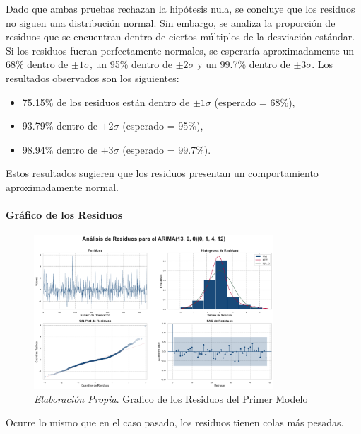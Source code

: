 \documentclass[12pt,letterpaper]{article}   %
\begin{document}
Dado que ambas pruebas rechazan la hipótesis nula, se concluye que los residuos no siguen una distribución normal. Sin embargo, se analiza la proporción de residuos que se encuentran dentro de ciertos múltiplos de la desviación estándar. Si los residuos fueran perfectamente normales, se esperaría aproximadamente un 68\% dentro de $\pm1\sigma$, un 95\% dentro de $\pm2\sigma$ y un 99.7\% dentro de $\pm3\sigma$. Los resultados observados son los siguientes:

\begin{itemize}
    \item 75.15\% de los residuos están dentro de $\pm1\sigma$ (esperado = 68\%),
    \item 93.79\% dentro de $\pm2\sigma$ (esperado = 95\%),
    \item 98.94\% dentro de $\pm3\sigma$ (esperado = 99.7\%).
\end{itemize}

Estos resultados sugieren que los residuos presentan un comportamiento aproximadamente normal.




\paragraph{Gráfico de los Residuos}
\begin{figure}[ht]
    \centering
    \includegraphics[width=0.8\textwidth]{imagenes/04-02-analisis-de-residuos-m2.pdf}
    \caption{\textit{Elaboración Propia}. Grafico de los Residuos del Primer Modelo}
\end{figure}

Ocurre lo mismo que en el caso pasado, los residuos tienen colas más pesadas.
\end{document}
